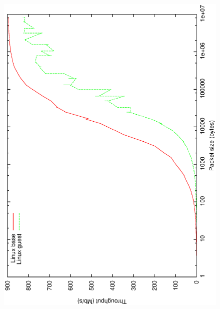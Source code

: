 \begin{figure}[tbp]
\begin{centering}
\label{fig:linux-network}
\includegraphics[scale=.7]{figs/linux-network}
\end{centering}
\end{figure}

